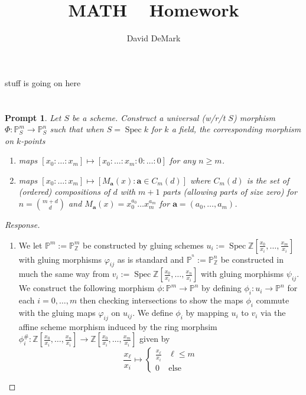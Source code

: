 \documentclass[english,letter,doublesided]{article}
\title{MATH \course~ Homework \Roman{hwn}}
\author{David DeMark}
\date{\due}
\renewcommand\vec{\mathbf}
\DeclareMathOperator{\spec}{Spec}
\newcommand{\ZZ}{\mathbb{Z}}
\newcommand{\PP}{\mathbb{P}}
\newcommand{\prob}[1]{\setcounter{section}{#1-1}\section{}}
\newtheorem*{prompt*}{Prompt}
\theoremstyle{remark}
\theoremstyle{definition}
\newcommand{\gph}{\varphi}
\newcommand{\fv}[2]{\frac{x_{#1}}{x_{#2}}}
\begin{document}
\maketitle
\prob{1}
stuff is going on here 
\prob{3}
\begin{prompt*}
Let $S$ be a scheme. Construct a universal (w/r/t $S$) morphism $\Phi:\PP^m_S\to \PP^n_S$ such that when $S=\spec k$ for $k$ a field, the corresponding morphism on $k$-points
\begin{enumerate}[label=\textit{(\roman*)}]
	\item maps $[x_0:\hdots:x_m]\mapsto [x_0:\hdots:x_m:0:\hdots:0]$ for any $n\geq m$. 
	\item maps $[x_0:\hdots:x_m]\mapsto [M_{\vec{a}}(x):\vec{a}\in C_m(d)]$ where $C_m(d)$ is the set of (ordered) compositions of $d$ with $m+1$ parts (allowing parts of size zero) for $n={m+d\choose d}$ and $M_{\vec{a}}(x)=x_0^{a_0}\hdots x_m^{a_m}$ for $\vec{a}=(a_0,\hdots,a_m)$.
\end{enumerate}
\end{prompt*}\begin{proof}[Response]
\begin{enumerate}[label=\textit{(\roman*)}]
	\item We let $\PP^m:=\PP^m_\ZZ$ be constructed by gluing schemes $u_i:= 
	\spec\ZZ[\fv{0}{i},\hdots,\fv{m}{i}]$ with gluing morphisms $\gph_{ij}$ as is standard and $\PP^^n:=\PP^n_\ZZ$ be constructed in much the same way from $v_i:= \spec\ZZ[\fv{0}{i},\hdots,\fv{n}{i}]$ with gluing morphisms $\psi_{ij}$. We construct the following morphism $\phi: \PP^m\to \PP^n$ by defining $\phi_i:u_i\to \PP^n$ for each $i=0,\hdots,m$ then checking intersections to show the maps $\phi_i$ commute with the gluing maps $\varphi_{ij}$ on $u_{ij}$. We define $\phi_i$ by mapping $u_i$ to $v_i$ via the affine scheme morphism induced by the ring morphsim $\phi_i^\#:\ZZ[\fv{0}{i},\hdots,\fv{n}{i}] \to \ZZ[\fv{0}{i},\hdots,\fv{m}{i}]$ given by \begin{equation*}\fv{\ell}{i}\mapsto\begin{cases}\fv{\ell}{i}&\ell\leq m\\0&\text{else}\end{cases}\end{equation*}

\end{enumerate}
\end{proof}
\end{document}
